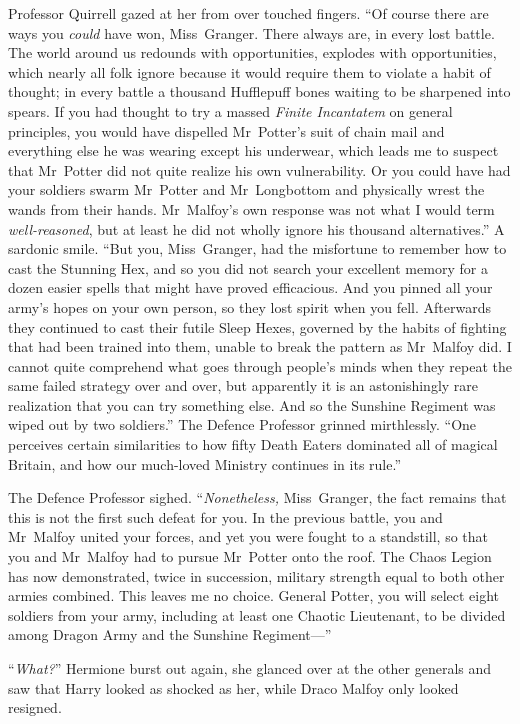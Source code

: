 Professor Quirrell gazed at her from over touched fingers.
“Of course there are ways you \emph{could} have won, Miss~Granger. There always are, in every lost battle. The world around us redounds with opportunities, explodes with opportunities, which nearly all folk ignore because it would require them to violate a habit of thought; in every battle a thousand Hufflepuff bones waiting to be sharpened into spears. If you had thought to try a massed \emph{Finite Incantatem} on general principles, you would have dispelled Mr~Potter’s suit of chain mail and everything else he was wearing except his underwear, which leads me to suspect that Mr~Potter did not quite realize his own vulnerability. Or you could have had your soldiers swarm Mr~Potter and Mr~Longbottom and physically wrest the wands from their hands. Mr~Malfoy’s own response was not what I would term \emph{well-reasoned}, but at least he did not wholly ignore his thousand alternatives.” A sardonic smile.
“But you, Miss~Granger, had the misfortune to remember how to cast the Stunning Hex, and so you did not search your excellent memory for a dozen easier spells that might have proved efficacious. And you pinned all your army’s hopes on your own person, so they lost spirit when you fell. Afterwards they continued to cast their futile Sleep Hexes, governed by the habits of fighting that had been trained into them, unable to break the pattern as Mr~Malfoy did. I cannot quite comprehend what goes through people’s minds when they repeat the same failed strategy over and over, but apparently it is an astonishingly rare realization that you can try something else. And so the Sunshine Regiment was wiped out by two soldiers.” The Defence Professor grinned mirthlessly.
“One perceives certain similarities to how fifty Death Eaters dominated all of magical Britain, and how our much-loved Ministry continues in its rule.”

The Defence Professor sighed. “\emph{Nonetheless,} Miss~Granger, the fact remains that this is not the first such defeat for you. In the previous battle, you and Mr~Malfoy united your forces, and yet you were fought to a standstill, so that you and Mr~Malfoy had to pursue Mr~Potter onto the roof. The Chaos Legion has now demonstrated, twice in succession, military strength equal to both other armies combined. This leaves me no choice. General Potter, you will select eight soldiers from your army, including at least one Chaotic Lieutenant, to be divided among Dragon Army and the Sunshine Regiment—”

“\emph{What?}” Hermione burst out again, she glanced over at the other generals and saw that Harry looked as shocked as her, while Draco Malfoy only looked resigned.

